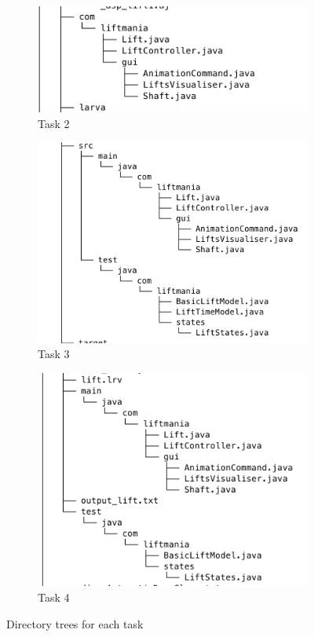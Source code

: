 \documentclass[a4paper, 12pt]{article}
\begin{document}
\begin{figure}
\centering
\begin{subfigure}{.5\textwidth}
  \centering
  \includegraphics[width=\linewidth]{images/task2-tree}
  \caption{Task 2}
\end{subfigure}%
\begin{subfigure}{.5\textwidth}
  \centering
  \includegraphics[width=\linewidth]{images/task3-tree}
  \caption{Task 3}
\end{subfigure}
\begin{subfigure}{.5\textwidth}
  \centering
  \includegraphics[width=\linewidth]{images/task4-tree}
  \caption{Task 4}
\end{subfigure}
\caption{Directory trees for each task}
\label{fig:directories-trees}
\end{figure}
\end{document}
